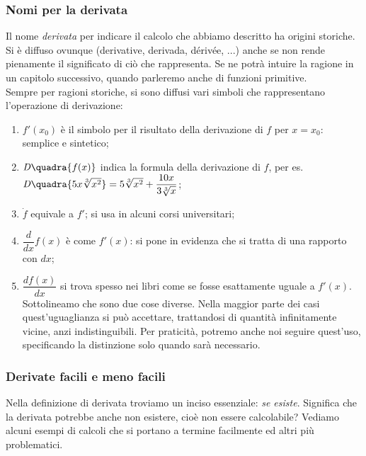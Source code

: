 \subsubsection{Nomi per la derivata}
Il nome \emph{derivata} per indicare il calcolo che abbiamo descritto ha 
origini storiche. Si è diffuso  ovunque (derivative, derivada, dérivée, ...) 
anche se non rende pienamente il significato di ciò che rappresenta. Se ne 
potrà intuire la ragione in un capitolo successivo, quando parleremo anche di
funzioni primitive.\\
Sempre per ragioni storiche, si sono diffusi vari simboli che rappresentano 
l'operazione di derivazione:
\begin{enumerate}[noitemsep]
 \item $f'(x_0)$ è il simbolo per il risultato della derivazione di $f$ 
 per $x= x_0$: semplice e sintetico;
 \item $\mathit{D}\quadra{f(x)}$ indica la formula della derivazione di $f$, 
 per es. $\mathit{D}\quadra{5x\sqrt[3]{x^2}}=5\sqrt[3]{x^2}+\dfrac{10x}
 {3\sqrt[3]{x}}$;
 \item $\dot{f}$ equivale a $f'$; si usa in alcuni corsi universitari;
 \item $\dfrac{d}{dx}f(x)$ è come $f'(x)$: si pone in evidenza che si tratta 
 di una rapporto con $dx$;
 \item $\dfrac{df(x)}{dx}$ si trova spesso nei libri come se fosse esattamente 
 uguale a $f'(x)$. Sottolineamo che sono due cose diverse.  
 Nella maggior parte dei casi quest'uguaglianza si può accettare, trattandosi 
 di quantità infinitamente vicine, anzi indistinguibili. Per praticità, potremo
 anche noi seguire quest'uso, specificando la distinzione solo quando sarà 
 necessario.
\end{enumerate}

\subsubsection{Derivate facili e meno facili}
Nella definizione di derivata troviamo un inciso essenziale: \emph{se esiste}.
Significa che la derivata potrebbe anche non esistere, cioè non essere 
calcolabile? Vediamo alcuni esempi di calcoli che si portano a termine facilmente 
ed altri più problematici.

